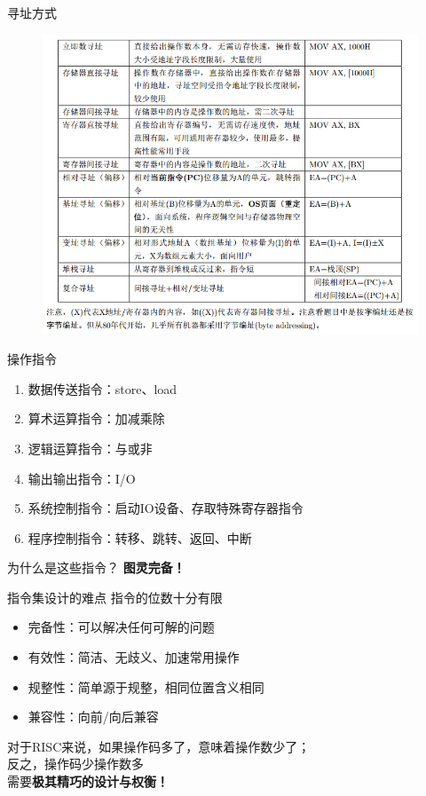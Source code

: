 \documentclass{myslide}
\begin{document}
\begin{frame}{寻址方式}
\begin{figure}
\centering
\includegraphics[width=0.8\linewidth]{fig/Lecture2/memory_addressing.PNG}
\end{figure}
\end{frame}

\begin{frame}{操作指令}
\begin{enumerate}
	\item 数据传送指令：store、load
	\item 算术运算指令：加减乘除
	\item 逻辑运算指令：与或非
	\item 输出输出指令：I/O
	\item 系统控制指令：启动IO设备、存取特殊寄存器指令
	\item 程序控制指令：转移、跳转、返回、中断
\end{enumerate}
为什么是这些指令？
\pause
\textbf{图灵完备！}
\end{frame}

\begin{frame}{指令集设计的难点}
指令的位数十分有限
\begin{itemize}
	\item 完备性：可以解决任何可解的问题
	\item 有效性：简洁、无歧义、加速常用操作
	\item 规整性：简单源于规整，相同位置含义相同
	\item 兼容性：向前/向后兼容
\end{itemize}
对于RISC来说，如果操作码多了，意味着操作数少了；\\
反之，操作码少操作数多\\
需要\textbf{极其精巧的设计与权衡！}
\end{frame}
\end{document}
